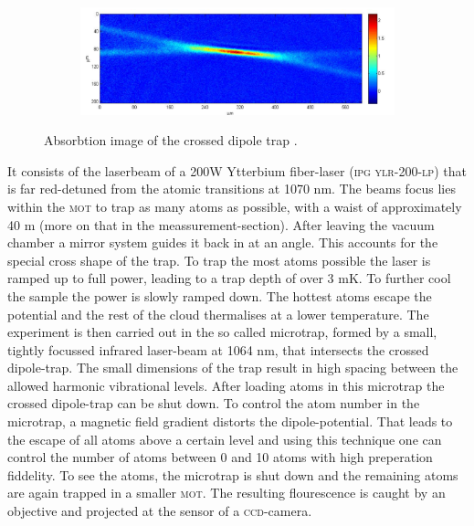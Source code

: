 \begin{figure}[h]
\centering
\begin{subfigure}[b]{0.8\textwidth}
                \includegraphics[width=\textwidth]{dipolefoto}
\end{subfigure}
\caption{Absorbtion image of the crossed dipole trap \cite{lompe}.}
\label{experiment}
\end{figure}
It consists of the laserbeam of a 200W Ytterbium fiber-laser (\textsc{ipg ylr-200-lp}) that is far red-detuned from the atomic transitions at 1070 nm. The beams focus lies within the \textsc{mot} to trap as many atoms as possible, with a waist of approximately 40 \mu m (more on that in the meassurement-section). After leaving the vacuum chamber a mirror system guides it back in at an angle. This accounts for the special cross shape of the trap. To trap the most atoms possible the laser is ramped up to full power, leading to a trap depth of over 3 mK. To further cool the sample the power is slowly ramped down. The hottest atoms escape the potential and the rest of the cloud thermalises at a lower temperature. The experiment is then carried out in the so called microtrap, formed by a small, tightly focussed infrared laser-beam at 1064 nm, that intersects the crossed dipole-trap. The small dimensions of the trap result in high spacing between the allowed harmonic vibrational levels. After loading atoms in this microtrap the crossed dipole-trap can be shut down. To control the atom number in the microtrap, a magnetic field gradient distorts the dipole-potential. That leads to the escape of all atoms above a certain level and using this technique one can control the number of atoms between 0 and 10 atoms with high preperation fiddelity. To see the atoms, the microtrap is shut down and the remaining atoms are again trapped in a smaller \textsc{mot}. The resulting flourescence is caught by an objective and projected at the sensor of a \textsc{ccd}-camera. 


